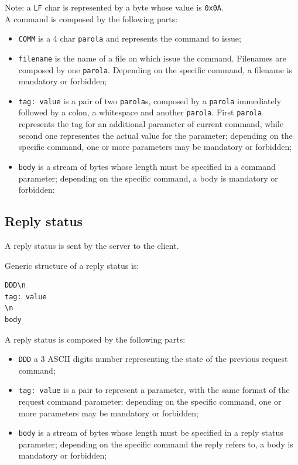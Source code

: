 \documentclass[a4paper,12pt]{article}
\begin{document}
Note: a \texttt{LF} char is represented by a byte whose value is \texttt{0x0A}.
\\
A command is composed by the following parts:
\begin{itemize}
  \item \texttt{COMM} is a 4 char \texttt{parola} and represents the command to issue;
  \item \texttt{filename} is the name of a file on which issue the command.
  Filenames are composed by one \texttt{parola}.
  Depending on the specific command, a filename is mandatory or forbidden;
  \item \texttt{tag: value} is a pair of two \texttt{parola}s, composed by a \texttt{parola} immediately followed by a colon, a whitespace and another \texttt{parola}.
  First \texttt{parola} represents the tag for an additional parameter of current command, while second one representes the actual value for the parameter; depending on the specific command, one or more parameters may be mandatory or forbidden;
  \item \texttt{body} is a stream of bytes whose length must be specified in a command parameter; depending on the specific command, a body is mandatory or forbidden:
\end{itemize}

\subsection{Reply status}
A reply status is sent by the server to the client.

Generic structure of a reply status is:

\begin{verbatim}
DDD\n
tag: value
\n
body
\end{verbatim}

A reply status is composed by the following parts:
\begin{itemize}
  \item \texttt{DDD} a 3 ASCII digits number representing the state of the previous request command;
  \item \texttt{tag: value} is a pair to represent a parameter, with the same format of the request command parameter; depending on the specific command, one or more parameters may be mandatory or forbidden;
  \item \texttt{body} is a stream of bytes whose length must be specified in a reply status parameter; depending on the specific command the reply refers to, a body is mandatory or forbidden;
\end{itemize}
\end{document}
